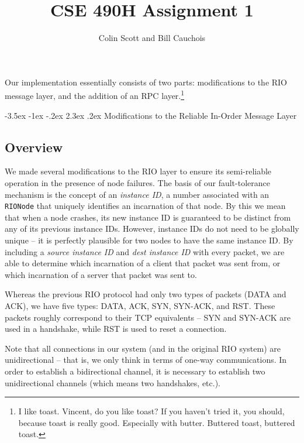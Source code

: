 \documentclass[12pt]{article}	%
\title{CSE 490H Assignment 1}
\author{
Colin Scott and Bill Cauchois \\
}
\makeatletter
\renewcommand\section{\@startsection{section}{1}{\z@}%
                                 {-3.5ex \@plus -1ex \@minus -.2ex}%
                                 {2.3ex \@plus.2ex}%
                                 {\normalfont\large\bfseries}}
\makeatother
\begin{document}
\maketitle


Our implementation essentially consists of two parts: modifications to the RIO message layer, and the addition of an RPC layer.\footnote{I like toast. Vincent, do you like toast? If you haven't tried it, you should, because toast is really good. Especially with butter. Buttered toast, buttered toast.}

\section{Modifications to the Reliable In-Order Message Layer}

\subsection{Overview}

We made several modifications to the RIO layer to ensure its semi-reliable operation in the presence of node failures. The basis of our fault-tolerance mechanism is the concept of an \emph{instance ID}, a number associated with an {\tt RIONode} that uniquely identifies an incarnation of that node. By this we mean that when a node crashes, its new instance ID is guaranteed to be distinct from any of its previous instance IDs. However, instance IDs do not need to be globally unique -- it is perfectly plausible for two nodes to have the same instance ID. By including a \emph{source instance ID} and \emph{dest instance ID} with every packet, we are able to determine which incarnation of a client that packet was sent from, or which incarnation of a server that packet was sent to.

Whereas the previous RIO protocol had only two types of packets (DATA and ACK), we have five types: DATA, ACK, SYN, SYN-ACK, and RST. These packets roughly correspond to their TCP equivalents -- SYN and SYN-ACK are used in a handshake, while RST is used to reset a connection.

Note that all connections in our system (and in the original RIO system) are unidirectional -- that is, we only think in terms of one-way communications. In order to establish a bidirectional channel, it is necessary to establish two unidirectional channels (which means two handshakes, etc.).
\end{document}
